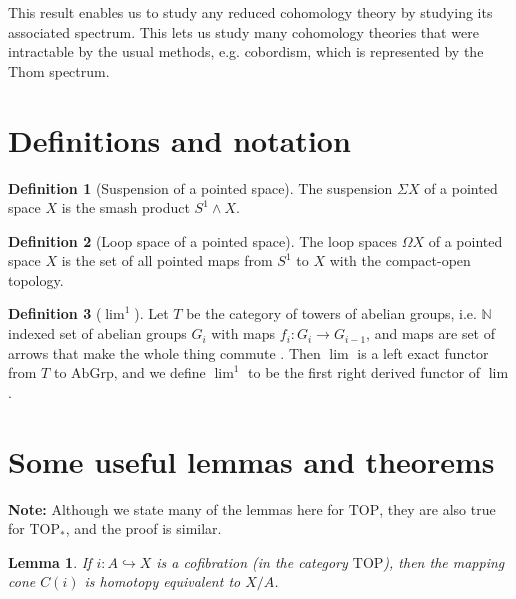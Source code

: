 \documentclass[12pt, notitlepage]{article}
\newtheorem{lem}[thm]{Lemma}
\theoremstyle{definition}
\newtheorem{defn}{Definition}[section]
\newcommand{\cat}[1]{\mathrm{#1}}
\begin{document}
This result enables us to study any reduced cohomology theory by studying its associated spectrum.
This lets us study many cohomology theories that were intractable by the usual methods, e.g.
cobordism, which is represented by the Thom spectrum.

\newpage

\appendix

\section{Definitions and notation}
\label{sec:definitions-notation}

\begin{defn}[Suspension of a pointed space]
  The suspension $\Sigma X$ of a pointed space $X$ is the smash product $S^1 \wedge X$.
\end{defn}

\begin{defn}[Loop space of a pointed space]
  The loop spaces $\Omega X$ of a pointed space $X$ is the set of all pointed maps from $S^1$ to $X$
  with the compact-open topology.
\end{defn}

\begin{defn}[$\lim^1$]
  Let $T$ be the category of towers of abelian groups, i.e. $\mathbb{N}$ indexed set of abelian
  groups $G_i$ with maps $f_i: G_i \to G_{i-1}$, and maps are set of arrows that make the whole
  thing commute . Then $\lim$ is a
  left exact functor from $T$ to $\cat{AbGrp}$, and we define $\lim^1$ to be the first right derived
  functor of $\lim$.
\end{defn}

\section{Some useful lemmas and theorems}
\label{sec:some-useful-lemmas}

\textbf{Note:} Although we state many of the lemmas here for $\cat{TOP}$, they are also true for
$\cat{TOP}_{\ast}$, and the proof is similar.

\begin{lem}
  If $i: A \hookrightarrow X$ is a cofibration (in the category $\cat{TOP}$), then the mapping cone
  $C(i)$ is homotopy equivalent to $X/A$.
\end{lem}
\end{document}
